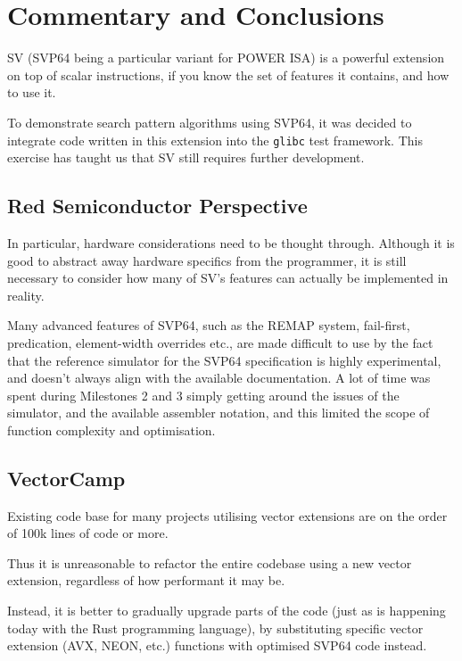 \chapter{Commentary and Conclusions}

\acrfull{SV} (\acrshort{SVP64} being a particular variant for \acrshort{POWER}
ISA) is a powerful extension on top of scalar instructions, if you know the set
of features it contains, and how to use it.

To demonstrate search pattern algorithms using \acrshort{SVP64}, it was decided
to integrate code written in this extension into the \texttt{glibc}
test framework. This exercise has taught us that \acrshort{SV} still requires
further development.

\section{Red Semiconductor Perspective}
In particular, hardware considerations need to be thought through.
Although it is good to abstract away hardware specifics from the programmer,
it is still necessary to consider how many of \acrshort{SV}'s features can
actually be implemented in reality.

Many advanced features of SVP64, such as the REMAP system, fail-first,
predication, element-width overrides etc., are made difficult to use
by the fact that the reference simulator for the SVP64 specification is
highly experimental, and doesn't always align with the available documentation.
A lot of time was spent during Milestones 2 and 3 simply getting around the
issues of the simulator, and the available assembler notation, and this limited
the scope of function complexity and optimisation.

\section{VectorCamp}

Existing code base for many projects utilising vector extensions are on the
order of 100k lines of code or more.

Thus it is unreasonable to refactor the entire codebase using a new vector
extension, regardless of how performant it may be.

Instead, it is better to gradually upgrade parts of the code (just as is
happening today with the Rust programming language), by substituting specific
vector extension (AVX, NEON, etc.) functions with optimised SVP64 code instead.


